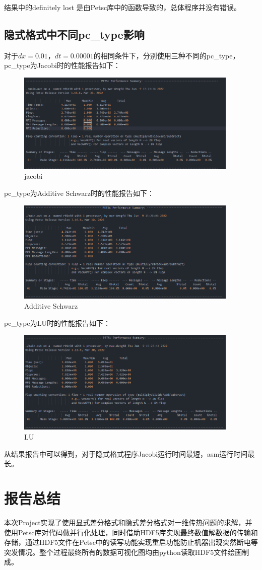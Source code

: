 \documentclass[
	20pt%
]{SUSTechHomework}
\begin{document}
\qquad 结果中的definitely lost 是由Petsc库中的函数导致的，总体程序并没有错误。
\subsection{隐式格式中不同pc\_type影响}
\qquad 对于$dx=0.01$，$dt=0.00001$的相同条件下，分别使用三种不同的pc\_type，pc\_type为Jacobi时的性能报告如下：
\begin{figure}[h]
    \centering
    \includegraphics[width=300pt]{img/jacobi.jpg}
    \caption{jacobi}
    \label{fig:my_label}
\end{figure}

\qquad pc\_type为Additive Schwarz时的性能报告如下：
\begin{figure}[h]
    \centering
    \includegraphics[width=300pt]{img/asm.jpg}
    \caption{Additive Schwarz}
    \label{fig:my_label}
\end{figure}
\clearpage
\qquad pc\_type为LU时的性能报告如下：
\begin{figure}[h]
    \centering
    \includegraphics[width=300pt]{img/lu.jpg}
    \caption{LU}
    \label{fig:my_label}
\end{figure}

\qquad 从结果报告中可以得到，对于隐式格式程序Jacobi运行时间最短，asm运行时间最长。

\section{报告总结}
\qquad 本次Project实现了使用显式差分格式和隐式差分格式对一维传热问题的求解，并使用Petsc库对代码做并行化处理，同时借助HDF5库实现最终数值解数据的传输和存储，通过HDF5文件在Petsc中的读写功能实现重启功能防止机器出现突然断电等突发情况。整个过程最终所有的数据可视化图均由python读取HDF5文件绘画制成。
\end{document}
